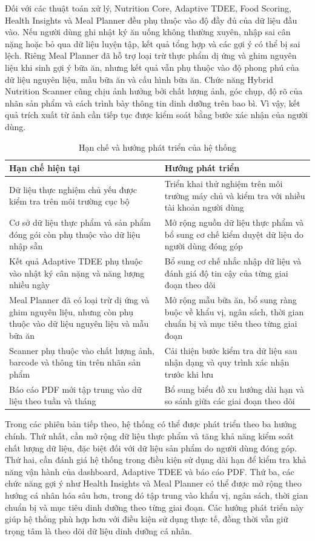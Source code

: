 Đối với các thuật toán xử lý, Nutrition Core, Adaptive TDEE, Food Scoring, Health Insights và Meal Planner đều phụ thuộc vào độ đầy đủ của dữ liệu đầu vào. Nếu người dùng ghi nhật ký ăn uống không thường xuyên, nhập sai cân nặng hoặc bỏ qua dữ liệu luyện tập, kết quả tổng hợp và các gợi ý có thể bị sai lệch. Riêng Meal Planner đã hỗ trợ loại trừ thực phẩm dị ứng và ghim nguyên liệu khi sinh gợi ý bữa ăn, nhưng kết quả vẫn phụ thuộc vào độ phong phú của dữ liệu nguyên liệu, mẫu bữa ăn và cấu hình bữa ăn. Chức năng Hybrid Nutrition Scanner cũng chịu ảnh hưởng bởi chất lượng ảnh, góc chụp, độ rõ của nhãn sản phẩm và cách trình bày thông tin dinh dưỡng trên bao bì. Vì vậy, kết quả trích xuất từ ảnh cần tiếp tục được kiểm soát bằng bước xác nhận của người dùng.

\begin{table}[H]
\centering
\caption{Hạn chế và hướng phát triển của hệ thống}
\begin{tabular}{|p{4cm}|p{11cm}|}
\hline
\textbf{Hạn chế hiện tại} & \textbf{Hướng phát triển} \\ \hline
Dữ liệu thực nghiệm chủ yếu được kiểm tra trên môi trường cục bộ & Triển khai thử nghiệm trên môi trường máy chủ và kiểm tra với nhiều tài khoản người dùng \\ \hline
Cơ sở dữ liệu thực phẩm và sản phẩm đóng gói còn phụ thuộc vào dữ liệu nhập sẵn & Mở rộng nguồn dữ liệu thực phẩm và bổ sung cơ chế kiểm duyệt dữ liệu do người dùng đóng góp \\ \hline
Kết quả Adaptive TDEE phụ thuộc vào nhật ký cân nặng và năng lượng nhiều ngày & Bổ sung cơ chế nhắc nhập dữ liệu và đánh giá độ tin cậy của từng giai đoạn theo dõi \\ \hline
Meal Planner đã có loại trừ dị ứng và ghim nguyên liệu, nhưng còn phụ thuộc vào dữ liệu nguyên liệu và mẫu bữa ăn & Mở rộng mẫu bữa ăn, bổ sung ràng buộc về khẩu vị, ngân sách, thời gian chuẩn bị và mục tiêu theo từng giai đoạn \\ \hline
Scanner phụ thuộc vào chất lượng ảnh, barcode và thông tin trên nhãn sản phẩm & Cải thiện bước kiểm tra dữ liệu sau nhận dạng và quy trình xác nhận trước khi lưu \\ \hline
Báo cáo PDF mới tập trung vào dữ liệu theo tuần và tháng & Bổ sung biểu đồ xu hướng dài hạn và so sánh giữa các giai đoạn theo dõi \\ \hline
\end{tabular}
\end{table}

Trong các phiên bản tiếp theo, hệ thống có thể được phát triển theo ba hướng chính. Thứ nhất, cần mở rộng dữ liệu thực phẩm và tăng khả năng kiểm soát chất lượng dữ liệu, đặc biệt đối với dữ liệu sản phẩm do người dùng đóng góp. Thứ hai, cần đánh giá hệ thống trong điều kiện sử dụng dài hạn để kiểm tra khả năng vận hành của dashboard, Adaptive TDEE và báo cáo PDF. Thứ ba, các chức năng gợi ý như Health Insights và Meal Planner có thể được mở rộng theo hướng cá nhân hóa sâu hơn, trong đó tập trung vào khẩu vị, ngân sách, thời gian chuẩn bị và mục tiêu dinh dưỡng theo từng giai đoạn. Các hướng phát triển này giúp hệ thống phù hợp hơn với điều kiện sử dụng thực tế, đồng thời vẫn giữ trọng tâm là theo dõi dữ liệu dinh dưỡng cá nhân.

